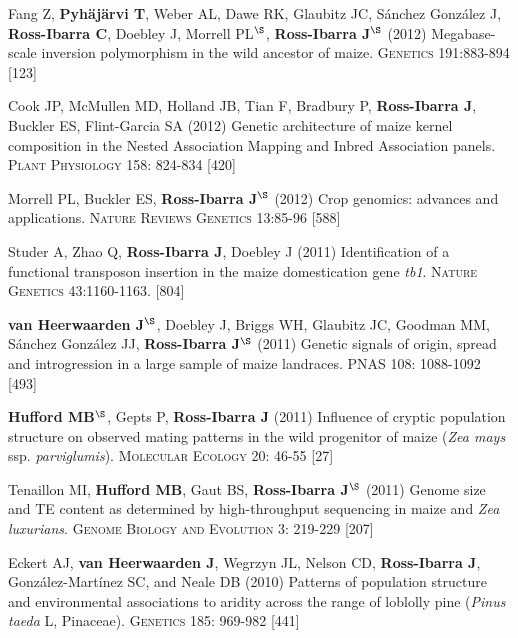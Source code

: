 \documentclass[letterpaper,10pt]{article}
\begin{document}
\begin{etaremune}
\item Fang Z, {\bf Pyh\"aj\"arvi T}, Weber AL, Dawe RK, Glaubitz JC, S\'{a}nchez Gonz\'{a}lez J, {\bf Ross-Ibarra C}, Doebley J, Morrell PL$^\S$, {\bf Ross-Ibarra J}$^\S$  (2012) Megabase-scale inversion polymorphism in the wild ancestor of maize. \textsc{Genetics} 191:883-894
 [123]\\


\item Cook JP, McMullen MD, Holland JB, Tian F, Bradbury P, {\bf Ross-Ibarra J}, Buckler ES, Flint-Garcia SA (2012) Genetic architecture of maize kernel composition in the Nested Association Mapping and Inbred Association panels. \textsc{Plant Physiology} 158: 824-834
 [420]\\

\item Morrell PL, Buckler ES, {\bf Ross-Ibarra J}$^\S$ (2012) Crop genomics: advances and applications.  \textsc{Nature Reviews Genetics} 13:85-96 %
 [588]\\


\item Studer A, Zhao Q, {\bf Ross-Ibarra J}, Doebley J (2011) Identification of a functional transposon insertion in the maize domestication gene \emph{tb1}.  \textsc{Nature Genetics} 43:1160-1163.
 [804]\\


\item {\bf van Heerwaarden J}$^\S$, Doebley J, Briggs WH, Glaubitz JC, Goodman MM, S\'{a}nchez Gonz\'{a}lez JJ, {\bf Ross-Ibarra J}$^\S$ (2011) Genetic signals of origin, spread and introgression in a large sample of maize landraces. PNAS 108: 1088-1092
 [493]\\


\item {\bf Hufford MB}$^\S$, Gepts P, {\bf Ross-Ibarra J} (2011) Influence of cryptic population structure on observed mating patterns in the wild progenitor of maize (\emph{Zea mays} ssp. \emph{parviglumis}).  \textsc{Molecular Ecology} 20: 46-55
 [27]\\


\item Tenaillon MI, {\bf Hufford MB}, Gaut BS, {\bf Ross-Ibarra J}$^\S$ (2011)  Genome size and TE content as determined by high-throughput sequencing in maize and \emph{Zea luxurians}.  \textsc{Genome Biology and Evolution } 3: 219-229
 [207]\\


\item Eckert AJ, {\bf van Heerwaarden J}, Wegrzyn JL, Nelson CD, {\bf Ross-Ibarra J}, Gonz\'{a}lez-Mart\'{i}nez SC, and Neale DB (2010) Patterns of population structure and environmental associations to aridity across the range of loblolly pine (\emph{Pinus taeda} L, Pinaceae).  \textsc{Genetics} 185: 969-982
 [441]\\



\end{etaremune}
\end{document}
